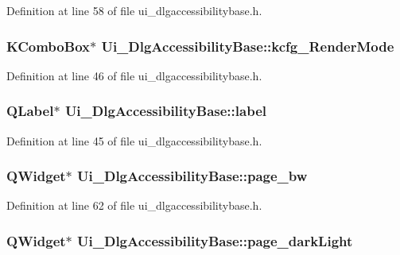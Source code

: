 Definition at line 58 of file ui\+\_\+dlgaccessibilitybase.\+h.

\hypertarget{classUi__DlgAccessibilityBase_a8eaeef4919006d3f9225067d5fa6f5e7}{
\subsubsection[{kcfg\+\_\+\+Render\+Mode}]{\setlength{\rightskip}{0pt plus 5cm}K\+Combo\+Box$\ast$ Ui\+\_\+\+Dlg\+Accessibility\+Base\+::kcfg\+\_\+\+Render\+Mode}}\label{classUi__DlgAccessibilityBase_a8eaeef4919006d3f9225067d5fa6f5e7}


Definition at line 46 of file ui\+\_\+dlgaccessibilitybase.\+h.

\hypertarget{classUi__DlgAccessibilityBase_af08bc2aa14cf40f1a58ce05b6d98fef6}{
\subsubsection[{label}]{\setlength{\rightskip}{0pt plus 5cm}Q\+Label$\ast$ Ui\+\_\+\+Dlg\+Accessibility\+Base\+::label}}\label{classUi__DlgAccessibilityBase_af08bc2aa14cf40f1a58ce05b6d98fef6}


Definition at line 45 of file ui\+\_\+dlgaccessibilitybase.\+h.

\hypertarget{classUi__DlgAccessibilityBase_ad6248c8c27f576cedc9e49b6144c4bc4}{
\subsubsection[{page\+\_\+bw}]{\setlength{\rightskip}{0pt plus 5cm}Q\+Widget$\ast$ Ui\+\_\+\+Dlg\+Accessibility\+Base\+::page\+\_\+bw}}\label{classUi__DlgAccessibilityBase_ad6248c8c27f576cedc9e49b6144c4bc4}


Definition at line 62 of file ui\+\_\+dlgaccessibilitybase.\+h.

\hypertarget{classUi__DlgAccessibilityBase_ac6a05225066cc7e921a37af4468a95df}{
\subsubsection[{page\+\_\+dark\+Light}]{\setlength{\rightskip}{0pt plus 5cm}Q\+Widget$\ast$ Ui\+\_\+\+Dlg\+Accessibility\+Base\+::page\+\_\+dark\+Light}}\label{classUi__DlgAccessibilityBase_ac6a05225066cc7e921a37af4468a95df}


